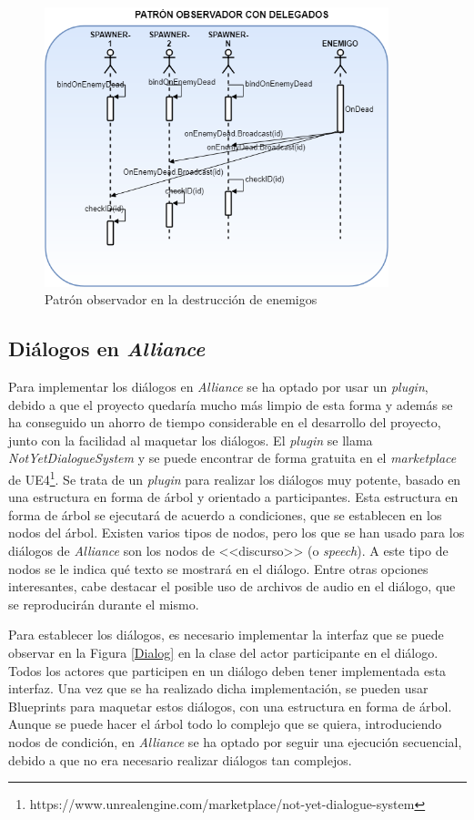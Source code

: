 \begin{figure}[H]
  \centering
  \includegraphics[width=10cm]{./images/Observer.png}
  \caption{Patrón observador en la destrucción de enemigos}
  \label{Observer}
\end{figure}

\subsection{Diálogos en \textit{Alliance}}

Para implementar los diálogos en \textit{Alliance} se ha optado por usar un \textit{plugin}, debido a que el proyecto quedaría mucho más limpio de esta forma y además se ha conseguido un ahorro de tiempo considerable en el desarrollo del proyecto, junto con la facilidad al maquetar los diálogos. El \textit{plugin} se llama \textit{NotYetDialogueSystem} y se puede encontrar de forma gratuita en el \textit{marketplace} de \ac{UE4}\footnote{https://www.unrealengine.com/marketplace/not-yet-dialogue-system}. Se trata de un \textit{plugin} para realizar los diálogos muy potente, basado en una estructura en forma de árbol y orientado a participantes. Esta estructura en forma de árbol se ejecutará de acuerdo a condiciones, que se establecen en los nodos del árbol. Existen varios tipos de nodos, pero los que se han usado para los diálogos de \textit{Alliance} son los nodos de <<discurso>> (o \textit{speech}). A este tipo de nodos se le indica qué texto se mostrará en el diálogo. Entre otras opciones interesantes, cabe destacar el posible uso de archivos de audio en el diálogo, que se reproducirán durante el mismo.

Para establecer los diálogos, es necesario implementar la interfaz que se puede observar en la Figura \ref{Dialog} en la clase del actor participante en el diálogo. Todos los actores que participen en un diálogo deben tener implementada esta interfaz. Una vez que se ha realizado dicha implementación, se pueden usar Blueprints para maquetar estos diálogos, con una estructura en forma de árbol. Aunque se puede hacer el árbol todo lo complejo que se quiera, introduciendo nodos de condición, en \textit{Alliance} se ha optado por seguir una ejecución secuencial, debido a que no era necesario realizar diálogos tan complejos.

